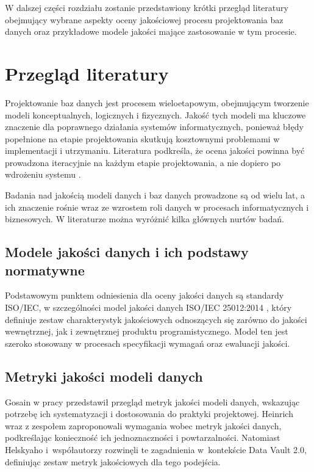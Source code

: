 W dalszej części rozdziału zostanie przedstawiony krótki przegląd literatury obejmujący wybrane aspekty oceny jakościowej procesu projektowania baz danych oraz przykładowe modele jakości mające zastosowanie w tym procesie.

\section{Przegląd literatury}

Projektowanie baz danych jest procesem wieloetapowym, obejmującym tworzenie modeli konceptualnych, logicznych i fizycznych. Jakość tych modeli ma kluczowe znaczenie dla poprawnego działania systemów informatycznych, ponieważ błędy popełnione na etapie projektowania skutkują kosztownymi problemami w implementacji i utrzymaniu. Literatura podkreśla, że ocena jakości powinna być prowadzona iteracyjnie na każdym etapie projektowania, a nie dopiero po wdrożeniu systemu \cite{Dubielewicz2007SPoQE,ISO25012}.

Badania nad jakością modeli danych i baz danych prowadzone są od wielu lat, a ich znaczenie rośnie wraz ze wzrostem roli danych w procesach informatycznych i biznesowych. W literaturze można wyróżnić kilka głównych nurtów badań.

\subsection{Modele jakości danych i ich podstawy normatywne}

Podstawowym punktem odniesienia dla oceny jakości danych są standardy ISO/IEC, w szczególności model jakości danych ISO/IEC 25012:2014 \cite{ISO25012}, który definiuje zestaw charakterystyk jakościowych odnoszących się zarówno do jakości wewnętrznej, jak i zewnętrznej produktu programistycznego. Model ten jest szeroko stosowany w procesach specyfikacji wymagań oraz ewaluacji jakości.

\subsection{Metryki jakości modeli danych}

Gosain w pracy \cite{Gosain2015} przedstawił przegląd metryk jakości modeli danych, wskazując potrzebę ich systematyzacji i dostosowania do praktyki projektowej. Heinrich wraz z zespołem \cite{Heinrich2018} zaproponowali wymagania wobec metryk jakości danych, podkreślając konieczność ich jednoznaczności i powtarzalności. Natomiast Helskyaho i~współautorzy \cite{Helskyaho2024} rozwinęli te zagadnienia w~kontekście Data Vault 2.0, definiując zestaw metryk jakościowych dla tego podejścia.

